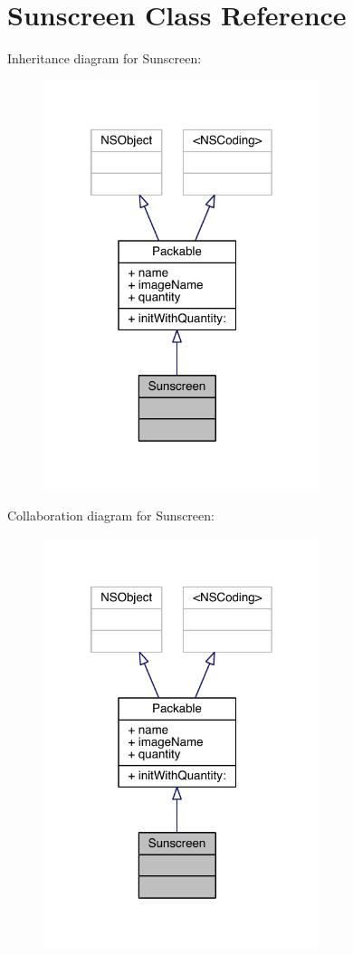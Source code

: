 \hypertarget{interface_sunscreen}{\section{Sunscreen Class Reference}
\label{interface_sunscreen}
}


Inheritance diagram for Sunscreen\-:\nopagebreak
\begin{figure}[H]
\begin{center}
\leavevmode
\includegraphics[width=229pt]{interface_sunscreen__inherit__graph}
\end{center}
\end{figure}


Collaboration diagram for Sunscreen\-:\nopagebreak
\begin{figure}[H]
\begin{center}
\leavevmode
\includegraphics[width=229pt]{interface_sunscreen__coll__graph}
\end{center}
\end{figure}
